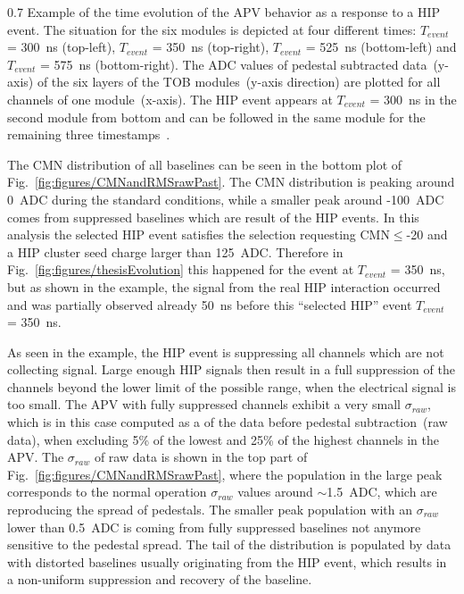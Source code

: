                  {0.7}       %
                 {Example of the time evolution of the APV behavior as a response to a HIP event. The situation for the six modules is depicted at four different times:  $T_{event}$ = 300~ns (top-left), $T_{event}$ = 350~ns (top-right), $T_{event}$ = 525~ns (bottom-left) and $T_{event}$ = 575~ns (bottom-right). The ADC values of pedestal subtracted data~(y-axis) of the six layers of the TOB modules~(y-axis direction) are plotted for all channels of one module~(x-axis). The HIP event appears at $T_{event}$ = 300~ns in the second module from bottom and can be followed in the same module for the remaining three timestamps~\cite{Bainbridge:2004jc}.} %

The CMN distribution of all baselines can be seen in the bottom plot of Fig.~\ref{fig:figures/CMNandRMSrawPast}. The CMN distribution is peaking around 0~ADC during the standard conditions, while a smaller peak around -100~ADC comes from suppressed baselines which are result of the HIP events. In this analysis the selected HIP event satisfies the selection requesting CMN$\leq$-20 and a HIP cluster seed charge larger than 125~ADC. Therefore in Fig.~\ref{fig:figures/thesisEvolution} this happened for the event at $T_{event}$ = 350~ns, but as shown in the example, the signal from the real HIP interaction occurred and was partially observed already 50~ns before this ``selected HIP'' event $T_{event}$ = 350~ns.

As seen in the example, the HIP event is suppressing all channels which are not collecting signal. Large enough HIP signals then result in a full suppression of the channels beyond the lower limit of the possible range, when the electrical signal is too small. The APV with fully suppressed channels exhibit a very small $\sigma_{raw}$, which is in this case computed as a \SD of the data before pedestal subtraction~(raw data), when excluding 5\% of the lowest and 25\% of the highest channels in the APV. The \SD $\sigma_{raw}$ of raw data is shown in the top part of Fig.~\ref{fig:figures/CMNandRMSrawPast}, where the population in the large peak corresponds to the normal operation $\sigma_{raw}$ values around $\sim$1.5~ADC, which are reproducing the spread of pedestals. The smaller peak population with an $\sigma_{raw}$ lower than 0.5~ADC is coming from fully suppressed baselines not anymore sensitive to the pedestal spread. The tail of the distribution is populated by data with distorted baselines usually originating from the HIP event, which results in a non-uniform suppression and recovery of the baseline.

